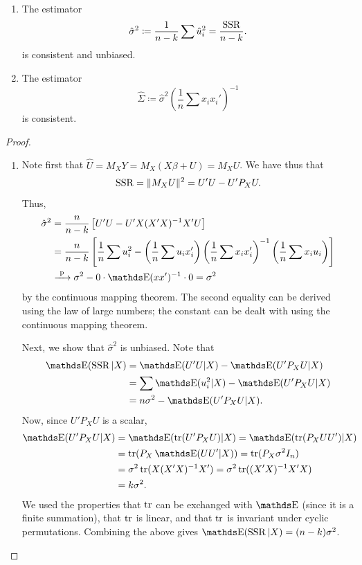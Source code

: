 \documentclass[letterpaper, 10pt]{article}
\begin{document}
\begin{proposition}~
  \begin{enumerate}[label=(\roman*)]
    \item %
      The estimator
      \[
        \hat{\sigma}^2 \coloneqq \frac{1}{n - k} \sum \hat{u}_i^2 = \frac{\operatorname{SSR}}{n - k}.
      \]
      is consistent and unbiased.
    \item %
      The estimator
      \[
        \hat{\Sigma} \coloneqq \hat{\sigma}^2 \left( \frac{1}{n} \sum x_i x_i' \right)^{-1}
      \]
      is consistent.
  \end{enumerate}
\end{proposition}
\begin{proof}~
\begin{enumerate}[label=(\roman*)]
  \item %
    Note first that \(\hat{U} = M_X Y = M_X (X \beta + U) = M_X U\).
    We have thus that
    \[
      \operatorname{SSR}
      = \lVert M_X U\rVert^2
      = U'U - U' P_X U.
    \]
    Thus,
    \begin{align*}
      \hat{\sigma}^2
      &= \frac{n}{n - k} \left[ U' U - U' X (X' X)^{-1} X' U \right] \\
      &= \frac{n}{n - k} \left[ \frac{1}{n} \sum u_i^2 - \left( \frac{1}{n} \sum u_i x_i' \right) \left( \frac{1}{n} \sum x_i x_i' \right)^{-1} \left( \frac{1}{n} \sum x_i u_i \right) \right] \\
      &\longprobto \sigma^2 - 0 \cdot \E(xx')^{-1} \cdot 0
      = \sigma^2
    \end{align*}
    by the continuous mapping theorem.
    The second equality can be derived using the law of large numbers; the constant can be dealt with using the continuous mapping theorem.

    Next, we show that \(\hat{\sigma}^2\) is unbiased.
    Note that
    \begin{align*}
      \E(\SSR | X)
      &= \E(U'U|X) - \E(U'P_X U|X) \\
      &= \sum \E(u_i^2 | X) - \E(U'P_XU|X) \\
      &= n \sigma^2 - \E(U' P_X U | X).
    \end{align*}
    Now, since \(U' P_X U\) is a scalar,
    \begin{align*}
      \E(U' P_X U | X)
      &= \E(\tr (U' P_X U) | X)
      = \E(\tr (P_X U U') | X) \\
      &= \tr(P_X \E (U U' | X))
      = \tr(P_X \sigma^2 I_n) \\
      &= \sigma^2 \tr(X (X' X)^{-1} X')
      = \sigma^2 \tr((X' X)^{-1} X' X) \\
      &= k \sigma^2.
    \end{align*}
    We used the properties that \(\operatorname{tr}\) can be exchanged with \(\E\) (since it is a finite summation), that \(\operatorname{tr}\) is linear, and that \(\operatorname{tr}\) is invariant under cyclic permutations.
    Combining the above gives \(\E(\SSR|X) = (n - k) \sigma^2\).


\end{enumerate}
\end{proof}
\end{document}
